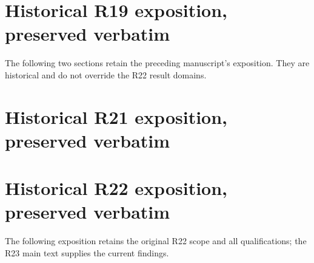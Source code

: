 \documentclass[ecta]{econsocart}
\theoremstyle{remark}
\begin{document}
\section{Historical R19 exposition, preserved verbatim}
The following two sections retain the preceding manuscript's exposition. They are historical and do not override the R22 result domains.
\begingroup\let\historylabel\label\renewcommand{\label}[1]{\historylabel{historical-r19-#1}}


\endgroup
\clearpage
\section{Historical R21 exposition, preserved verbatim}
\begingroup\let\historylabel\label\renewcommand{\label}[1]{\historylabel{historical-r21-#1}}


\endgroup
\clearpage
\section{Historical R22 exposition, preserved verbatim}
The following exposition retains the original R22 scope and all qualifications; the R23 main text supplies the current findings.
\begingroup\let\oldlabel\label\renewcommand{\label}[1]{\oldlabel{historical-r22-#1}}


\endgroup
\clearpage

\end{document}
